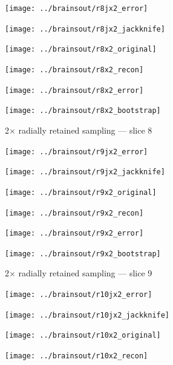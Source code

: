 \documentclass[article]{jdssv}
\begin{document}
\begin{appendix}
\begin{figure}
\begin{centering}
\parbox{\imsize}{\texttt{[image: ../brainsout/r8jx2\_error]}}
\parbox{\imsize}{\texttt{[image: ../brainsout/r8jx2\_jackknife]}}

\vspace{\vertsep}

\parbox{\imsize}{\texttt{[image: ../brainsout/r8x2\_original]}}
\parbox{\imsize}{\texttt{[image: ../brainsout/r8x2\_recon]}}

\vspace{\vertsep}

\parbox{\imsize}{\texttt{[image: ../brainsout/r8x2\_error]}}
\parbox{\imsize}{\texttt{[image: ../brainsout/r8x2\_bootstrap]}}

\end{centering}
\caption{2$\times$ radially retained sampling --- slice 8}
\end{figure}


\begin{figure}
\begin{centering}

\parbox{\imsize}{\texttt{[image: ../brainsout/r9jx2\_error]}}
\parbox{\imsize}{\texttt{[image: ../brainsout/r9jx2\_jackknife]}}

\vspace{\vertsep}

\parbox{\imsize}{\texttt{[image: ../brainsout/r9x2\_original]}}
\parbox{\imsize}{\texttt{[image: ../brainsout/r9x2\_recon]}}

\vspace{\vertsep}

\parbox{\imsize}{\texttt{[image: ../brainsout/r9x2\_error]}}
\parbox{\imsize}{\texttt{[image: ../brainsout/r9x2\_bootstrap]}}

\end{centering}
\caption{2$\times$ radially retained sampling --- slice 9}
\end{figure}


\begin{figure}
\begin{centering}

\parbox{\imsize}{\texttt{[image: ../brainsout/r10jx2\_error]}}
\parbox{\imsize}{\texttt{[image: ../brainsout/r10jx2\_jackknife]}}

\vspace{\vertsep}

\parbox{\imsize}{\texttt{[image: ../brainsout/r10x2\_original]}}
\parbox{\imsize}{\texttt{[image: ../brainsout/r10x2\_recon]}}

\vspace{\vertsep}


\end{centering}
\end{figure}
\end{appendix}
\end{document}
